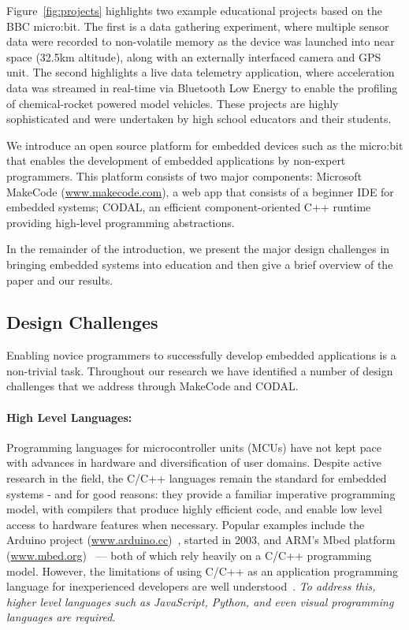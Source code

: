 Figure~\ref{fig:projects} highlights two example educational projects based on the BBC micro:bit. The first is a data gathering experiment, where multiple sensor data were recorded to non-volatile memory as the device was launched into near space (32.5km altitude), along with an externally interfaced camera and GPS unit. The second highlights a live data telemetry application, where acceleration data was streamed in real-time via Bluetooth Low Energy to enable the profiling of chemical-rocket powered model vehicles. These projects are highly sophisticated and were undertaken by high school educators and their students.

We introduce an open source platform for embedded devices such as the micro:bit that enables the development of embedded applications by non-expert programmers. This platform consists of two major components: Microsoft MakeCode (\url{www.makecode.com}), a web app that consists of a beginner IDE for embedded
systems; CODAL, an efficient component-oriented C++ runtime 
providing high-level programming abstractions.

In the remainder of the introduction, we present the major design challenges in
bringing embedded systems into education and then give a brief overview of the paper
and our results.

\subsection{Design Challenges}
\label{sec:DesignChallenges}
Enabling novice programmers to successfully develop embedded applications is a non-trivial task. Throughout our research we have identified a number of design challenges that we address through MakeCode and CODAL.

\paragraph{High Level Languages:}
Programming languages for microcontroller units (MCUs) have not kept pace with advances in hardware and diversification of user domains. Despite active research in the field, the C/C++ languages remain the standard for embedded systems - and for good reasons: they provide a familiar imperative programming model, with compilers that produce highly efficient code, and enable low level access to hardware features when necessary. Popular examples include the Arduino project (\url{www.arduino.cc})~\cite{buildingArduino2014}, started in 2003, and ARM's Mbed platform (\url{www.mbed.org})~\cite{ARMmbed} --- both of which rely heavily on a C/C++ programming model. However, the limitations of using C/C++ as an application programming language for inexperienced developers are well understood~\cite{blikstein2013gears}. \emph{To address this, higher level languages such as JavaScript, Python, and even visual programming languages are required}.

